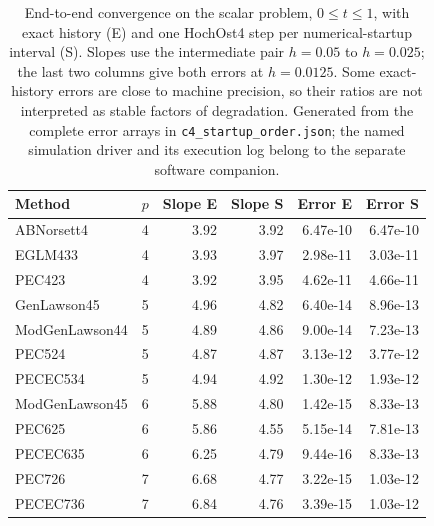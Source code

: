 \begin{table}[t]
\centering\small
\caption{End-to-end convergence on the scalar problem, $0\le t\le1$, with exact history (E) and one HochOst4 step per numerical-startup interval (S). Slopes use the intermediate pair $h=0.05$ to $h=0.025$; the last two columns give both errors at $h=0.0125$. Some exact-history errors are close to machine precision, so their ratios are not interpreted as stable factors of degradation. Generated from the complete error arrays in \texttt{c4\_startup\_order.json}; the named simulation driver and its execution log belong to the separate software companion.}\label{tab:startup}
\begin{tabular}{@{}lrrrrr@{}}\toprule
Method & $p$ & Slope E & Slope S & Error E & Error S\\\midrule
ABNorsett4 & 4 & 3.92 & 3.92 & 6.47e-10 & 6.47e-10\\
EGLM433 & 4 & 3.93 & 3.97 & 2.98e-11 & 3.03e-11\\
PEC423 & 4 & 3.92 & 3.95 & 4.62e-11 & 4.66e-11\\
GenLawson45 & 5 & 4.96 & 4.82 & 6.40e-14 & 8.96e-13\\
ModGenLawson44 & 5 & 4.89 & 4.86 & 9.00e-14 & 7.23e-13\\
PEC524 & 5 & 4.87 & 4.87 & 3.13e-12 & 3.77e-12\\
PECEC534 & 5 & 4.94 & 4.92 & 1.30e-12 & 1.93e-12\\
ModGenLawson45 & 6 & 5.88 & 4.80 & 1.42e-15 & 8.33e-13\\
PEC625 & 6 & 5.86 & 4.55 & 5.15e-14 & 7.81e-13\\
PECEC635 & 6 & 6.25 & 4.79 & 9.44e-16 & 8.33e-13\\
PEC726 & 7 & 6.68 & 4.77 & 3.22e-15 & 1.03e-12\\
PECEC736 & 7 & 6.84 & 4.76 & 3.39e-15 & 1.03e-12\\
\bottomrule
\end{tabular}
\end{table}
